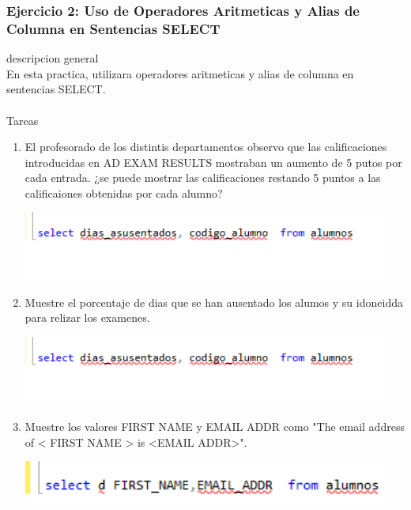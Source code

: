 \documentclass[12pt,letterpaper]{article}
\begin{document}
\subsubsection{Ejercicio 2: Uso de Operadores Aritmeticas y Alias de Columna en Sentencias SELECT} 
descripcion general  \\
En esta practica, utilizara operadores aritmeticas y alias de columna en sentencias SELECT.\\
\\
Tareas \\
\begin{enumerate}[1.]
     \item El profesorado de los distintis departamentos observo que las calificaciones introducidas en AD EXAM RESULTS mostraban un aumento de 5 putos por cada entrada. ¿se puede mostrar las calificaciones restando 5 puntos a las calificaiones obtenidas por cada alumno?
     

\begin{center}
\includegraphics[width=12cm]{./IMAGENES/imagen6_2_2}
\end{center}

     
     
       
    \item Muestre el porcentaje de dias que se han ausentado los alumos y su idoneidda para relizar los examenes.
    
   
\begin{center}
\includegraphics[width=12cm]{./IMAGENES/imagen6_2_2}
\end{center}

    
    \item Muestre los valores FIRST NAME y EMAIL ADDR como "The email address of < FIRST NAME > is <EMAIL ADDR>".
    
   
\begin{center}
\includegraphics[width=12cm]{./IMAGENES/imagen6_2_3}
\end{center}


\end{enumerate}
\end{document}
